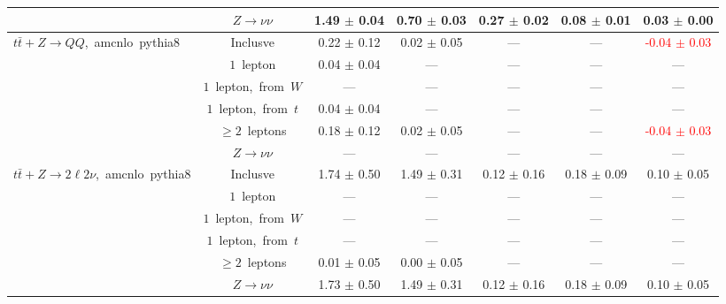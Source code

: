 \documentclass{article}
\begin{document}
\begin{longtable}{|l|c|c|c|c|c|c|}
 & $Z\rightarrow\nu\nu$  & 1.49 $\pm$ 0.04  & 0.70 $\pm$ 0.03  & 0.27 $\pm$ 0.02  & 0.08 $\pm$ 0.01  & 0.03 $\pm$ 0.00 \\* 
\hline 
\multirow{6}{*}{$t\bar{t}+Z{\rightarrow}QQ$,~amcnlo~pythia8} & Inclusve  & 0.22 $\pm$ 0.12  & 0.02 $\pm$ 0.05  & ---  & ---  & \textcolor{red}{ -0.04 $\pm$ 0.03 } \\* 
 & $1$~lepton  & 0.04 $\pm$ 0.04  & ---  & ---  & ---  & --- \\* 
 & $1$~lepton,~from~$W$  & ---  & ---  & ---  & ---  & --- \\* 
 & $1$~lepton,~from~$t$  & 0.04 $\pm$ 0.04  & ---  & ---  & ---  & --- \\* 
 & $\ge2$~leptons  & 0.18 $\pm$ 0.12  & 0.02 $\pm$ 0.05  & ---  & ---  & \textcolor{red}{ -0.04 $\pm$ 0.03 } \\* 
 & $Z\rightarrow\nu\nu$  & ---  & ---  & ---  & ---  & --- \\* 
\hline 
\multirow{6}{*}{$t\bar{t}+Z{\rightarrow}2{\ell}2{\nu}$,~amcnlo~pythia8} & Inclusve  & 1.74 $\pm$ 0.50  & 1.49 $\pm$ 0.31  & 0.12 $\pm$ 0.16  & 0.18 $\pm$ 0.09  & 0.10 $\pm$ 0.05 \\* 
 & $1$~lepton  & ---  & ---  & ---  & ---  & --- \\* 
 & $1$~lepton,~from~$W$  & ---  & ---  & ---  & ---  & --- \\* 
 & $1$~lepton,~from~$t$  & ---  & ---  & ---  & ---  & --- \\* 
 & $\ge2$~leptons  & 0.01 $\pm$ 0.05  & 0.00 $\pm$ 0.05  & ---  & ---  & --- \\* 
 & $Z\rightarrow\nu\nu$  & 1.73 $\pm$ 0.50  & 1.49 $\pm$ 0.31  & 0.12 $\pm$ 0.16  & 0.18 $\pm$ 0.09  & 0.10 $\pm$ 0.05 \\* 
\hline 
\end{longtable} 

 
 
 
 
\pagebreak 

 
 
 
 
\end{document}

